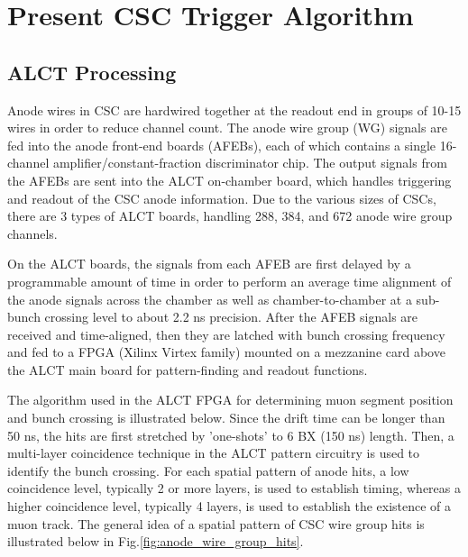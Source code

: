 \section{Present CSC Trigger Algorithm}
\label{sec:present_algo}

\subsection{ALCT Processing}

Anode wires in CSC are hardwired together at the readout end in groups of 10-15 wires in order to reduce channel count. The anode wire group (WG) signals are fed into the anode front-end boards (AFEBs), each of which contains a single 16-channel amplifier/constant-fraction discriminator chip. The output signals from the AFEBs are sent into the ALCT on-chamber board, which handles triggering and readout of the CSC anode information. Due to the various sizes of CSCs, there are 3 types of ALCT boards, handling 288, 384, and 672 anode wire group channels.

On the ALCT boards, the signals from each AFEB are first delayed by a programmable amount of time in order to perform an average time alignment of the anode signals across the chamber as well as chamber-to-chamber at a sub-bunch crossing level to about 2.2 ns precision. After the AFEB signals are received and time-aligned, then they are latched with bunch crossing frequency and fed to a FPGA (Xilinx Virtex family) mounted on a mezzanine card above the ALCT main board for pattern-finding and readout functions.

The algorithm used in the ALCT FPGA for determining muon segment position and bunch crossing is illustrated below. Since the drift time can be longer than 50 ns, the hits are first stretched by 'one-shots' to 6 BX (150 ns) length. Then, a multi-layer coincidence technique in the ALCT pattern circuitry is used to identify the bunch crossing. For each spatial pattern of anode hits, a low coincidence level, typically 2 or more layers, is used to establish timing, whereas a higher coincidence level, typically 4 layers, is used to establish the existence of a muon track. The general idea of a spatial pattern of CSC wire group hits is illustrated below in Fig.\ref{fig:anode_wire_group_hits}.

